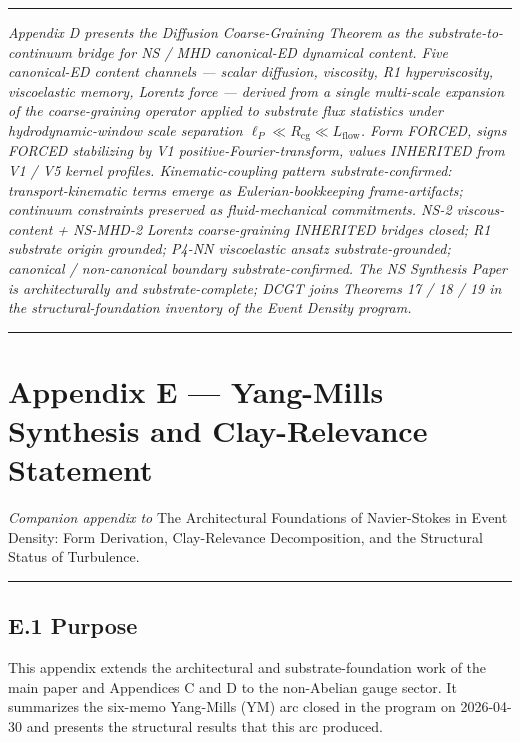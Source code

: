 \documentclass[
  11pt,a4paper]{article}
\begin{document}
\begin{center}\rule{0.5\linewidth}{0.5pt}\end{center}

\emph{Appendix D presents the Diffusion Coarse-Graining Theorem as the
substrate-to-continuum bridge for NS / MHD canonical-ED dynamical
content. Five canonical-ED content channels --- scalar diffusion,
viscosity, R1 hyperviscosity, viscoelastic memory, Lorentz force ---
derived from a single multi-scale expansion of the coarse-graining
operator applied to substrate flux statistics under hydrodynamic-window
scale separation \(\ell_P \ll R_\mathrm{cg} \ll L_\mathrm{flow}\). Form
FORCED, signs FORCED stabilizing by V1 positive-Fourier-transform,
values INHERITED from V1 / V5 kernel profiles. Kinematic-coupling
pattern substrate-confirmed: transport-kinematic terms emerge as
Eulerian-bookkeeping frame-artifacts; continuum constraints preserved as
fluid-mechanical commitments. NS-2 viscous-content + NS-MHD-2 Lorentz
coarse-graining INHERITED bridges closed; R1 substrate origin grounded;
P4-NN viscoelastic ansatz substrate-grounded; canonical / non-canonical
boundary substrate-confirmed. The NS Synthesis Paper is architecturally
and substrate-complete; DCGT joins Theorems 17 / 18 / 19 in the
structural-foundation inventory of the Event Density program.}

\begin{center}\rule{0.5\linewidth}{0.5pt}\end{center}

\section{Appendix E --- Yang-Mills Synthesis and Clay-Relevance
Statement}\label{appendix-e-yang-mills-synthesis-and-clay-relevance-statement}

\emph{Companion appendix to} The Architectural Foundations of
Navier-Stokes in Event Density: Form Derivation, Clay-Relevance
Decomposition, and the Structural Status of Turbulence.

\begin{center}\rule{0.5\linewidth}{0.5pt}\end{center}

\subsection{E.1 Purpose}\label{e.1-purpose}

This appendix extends the architectural and substrate-foundation work of
the main paper and Appendices C and D to the non-Abelian gauge sector.
It summarizes the six-memo Yang-Mills (YM) arc closed in the program on
2026-04-30 and presents the structural results that this arc produced.
\end{document}
